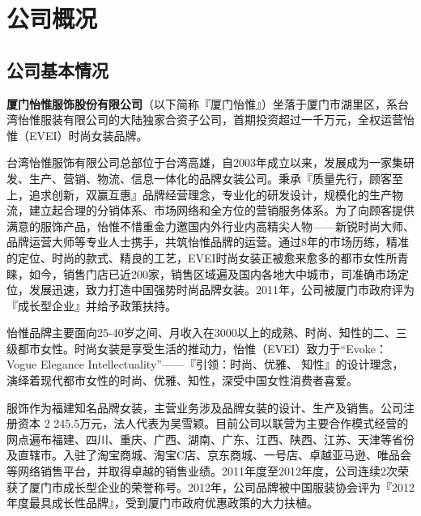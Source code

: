 
\chapter{公司概况}

\section{公司基本情况}
{\bfseries 厦门怡惟服饰股份有限公司}（以下简称『厦门怡惟』）坐落于厦门市湖里区，系台湾怡惟服装有限公司的大陆独家合资子公司，首期投资超过一千万元，全权运营怡惟（EVEI）时尚女装品牌。

台湾怡惟服饰有限公司总部位于台湾高雄，自2003年成立以来，发展成为一家集研发、生产、营销、物流、信息一体化的品牌女装公司。秉承『质量先行，顾客至上，追求创新，双赢互惠』品牌经营理念，专业化的研发设计，规模化的生产物流，建立起合理的分销体系、市场网络和全方位的营销服务体系。为了向顾客提供满意的服饰产品，怡惟不惜重金力邀国内外行业内高精尖人物——新锐时尚大师、品牌运营大师等专业人士携手，共筑怡惟品牌的运营。通过8年的市场历练，精准的定位、时尚的款式、精良的工艺，EVEI时尚女装正被愈来愈多的都市女性所青睐，如今，销售门店已近200家，销售区域遍及国内各地大中城市，司准确市场定位，发展迅速，致力打造中国强势时尚品牌女装。2011年，公司被厦门市政府评为『成长型企业』并给予政策扶持。

怡惟品牌主要面向25-40岁之间、月收入在3000以上的成熟、时尚、知性的二、三级都市女性。时尚女装是享受生活的推动力，怡惟（EVEI）致力于“Evoke：Vogue  Elegance  Intellectuality”——『引领：时尚、优雅、 知性』的设计理念，演绎着现代都市女性的时尚、优雅、知性，深受中国女性消费者喜爱。

服饰作为福建知名品牌女装，主营业务涉及品牌女装的设计、生产及销售。公司注册资本 2 245.5万元，法人代表为吴雪颖。目前公司以联营为主要合作模式经营的网点遍布福建、四川、重庆、广西、湖南、广东、江西、陕西、江苏、天津等省份及直辖市。入驻了淘宝商城、淘宝C店、京东商城、一号店、卓越亚马逊、唯品会等网络销售平台，并取得卓越的销售业绩。2011年度至2012年度，公司连续2次荣获了厦门市成长型企业的荣誉称号。2012年，公司品牌被中国服装协会评为『2012年度最具成长性品牌』，受到厦门市政府优惠政策的大力扶植。

